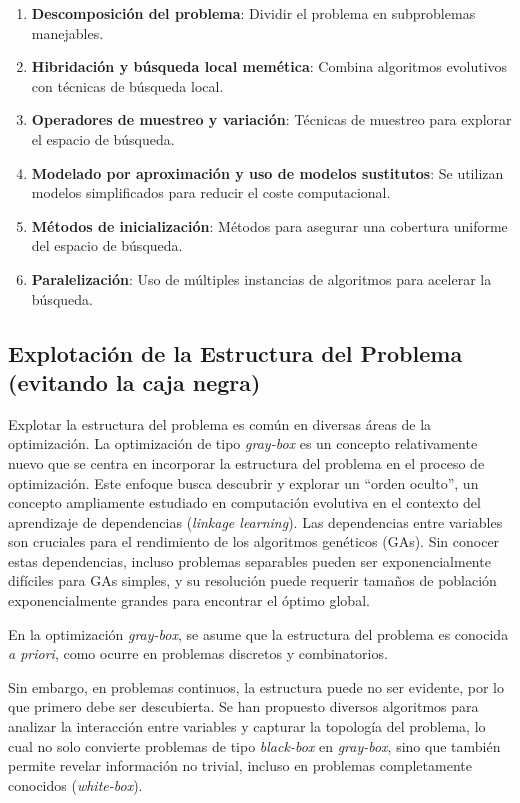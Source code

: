 \begin{enumerate}
    \item \textbf{Descomposición del problema}: Dividir el problema en subproblemas manejables.
    \item \textbf{Hibridación y búsqueda local memética}: Combina algoritmos evolutivos con técnicas de búsqueda local.
    \item \textbf{Operadores de muestreo y variación}: Técnicas de muestreo para explorar el espacio de búsqueda.
    \item \textbf{Modelado por aproximación y uso de modelos sustitutos}: Se utilizan modelos simplificados para reducir el coste computacional.
    \item \textbf{Métodos de inicialización}: Métodos para asegurar una cobertura uniforme del espacio de búsqueda.
    \item \textbf{Paralelización}: Uso de múltiples instancias de algoritmos para acelerar la búsqueda.
\end{enumerate}

\subsection*{Explotación de la Estructura del Problema (evitando la caja negra)}

Explotar la estructura del problema es común en diversas áreas de la optimización. La optimización de tipo \textit{gray-box} es un concepto relativamente nuevo que se centra en incorporar la estructura del problema en el proceso de optimización. Este enfoque busca descubrir y explorar un “orden oculto”, un concepto ampliamente estudiado en computación evolutiva en el contexto del aprendizaje de dependencias (\textit{linkage learning}). Las dependencias entre variables son cruciales para el rendimiento de los algoritmos genéticos (GAs). Sin conocer estas dependencias, incluso problemas separables pueden ser exponencialmente difíciles para GAs simples, y su resolución puede requerir tamaños de población exponencialmente grandes para encontrar el óptimo global.

En la optimización \textit{gray-box}, se asume que la estructura del problema es conocida \textit{a priori}, como ocurre en problemas discretos y combinatorios.

Sin embargo, en problemas continuos, la estructura puede no ser evidente, por lo que primero debe ser descubierta. Se han propuesto diversos algoritmos para analizar la interacción entre variables y capturar la topología del problema, lo cual no solo convierte problemas de tipo \textit{black-box} en \textit{gray-box}, sino que también permite revelar información no trivial, incluso en problemas completamente conocidos (\textit{white-box}).

